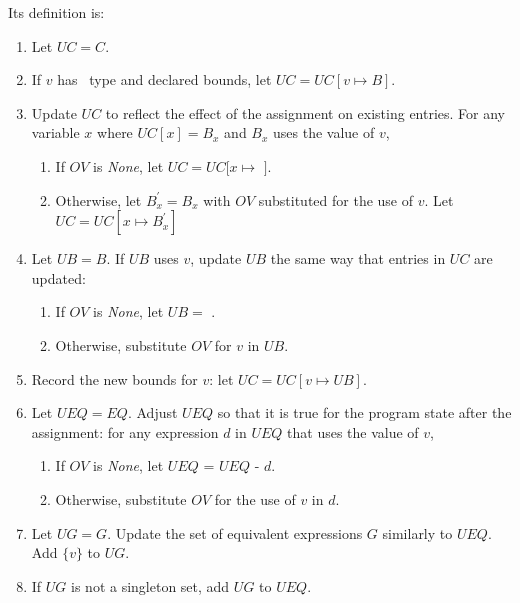 Its definition is:
\begin{enumerate}
\item Let $\mathit{UC} = C$.
\item If $v$ has \arrayptr\ type and declared bounds, let $\mathit{UC} = \mathit{UC}[v \mapsto B]$.
\item Update $\mathit{UC}$ to reflect the effect of the assignment on existing entries.
For any variable $x$ where $\mathit{UC}[x] = B_x$ and $B_x$ uses the value of $v$,
\begin{enumerate}
\item If $OV$ is {\it None}, let $\mathit{UC} = \mathit{UC}[x \mapsto$ \boundsunknown $]$.
\item  Otherwise, let $B_x^\prime = B_x$ with $OV$ substituted for the use of $v$.
Let $\mathit{UC} = \mathit{UC}[x \mapsto B_x^\prime]$
\end{enumerate}
\item Let $UB = B$.  If $UB$ uses $v$, update $UB$ the same way that entries in $UC$
are updated:
\begin{enumerate}
\item If $OV$ is {\it None}, let $UB = $ \boundsunknown.
\item Otherwise, substitute $OV$ for $v$ in $UB$.
\end{enumerate}
\item Record the new bounds for $v$: let $\mathit{UC} = \mathit{UC}[v \mapsto UB]$.
\item Let $UEQ = EQ$.  Adjust $UEQ$ so that it is true for the program state after the assignment: for any expression $d$ in $UEQ$ that uses the value of $v$,
\begin{enumerate}
\item If $OV$ is {\it None}, let $UEQ$ = $UEQ $ - $d$.
\item Otherwise, substitute $OV$ for the use of $v$ in $d$.
\end{enumerate}
\item Let $UG = G$. Update the set of equivalent expressions $G$ similarly to $UEQ$. Add $\{v\}$ to $UG$.
\item If $UG$ is not a singleton set, add $UG$ to $UEQ$.
\end{enumerate}

